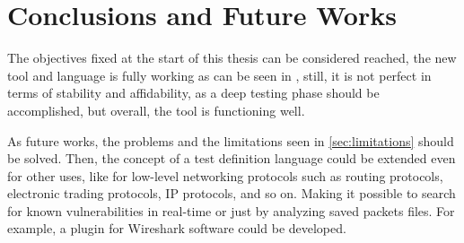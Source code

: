 \chapter{Conclusions and Future Works}
\label{chap:Conclusions}
The objectives fixed at the start of this thesis can be considered reached, the new tool and language is fully working as can be seen in \cite{sofia_zanrosso}, still, it is not perfect in terms of stability and affidability, as a deep testing phase should be accomplished, but overall, the tool is functioning well.

As future works, the problems and the limitations seen in \ref{sec:limitations} should be solved. Then, the concept of a test definition language could be extended even for other uses, like for low-level networking protocols such as routing protocols, electronic trading protocols, IP protocols, and so on. Making it possible to search for known vulnerabilities in real-time or just by analyzing saved packets files. For example, a plugin for Wireshark software could be developed.





